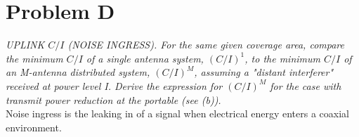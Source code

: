 \section{Problem D}
\textit{ UPLINK $C/I$ (NOISE INGRESS). For the same given coverage area, compare the minimum $C/I$ of a single 
antenna system, $(C/I)^1$, to the minimum $C/I$ of an M-antenna distributed system, $(C/I)^M$, assuming a "distant 
interferer" received at power level I. Derive the expression for $(C/I)^M$ for the case with transmit power 
reduction at the portable (see (b)).}\\

Noise ingress is the leaking in of a signal when electrical energy enters a coaxial environment. 